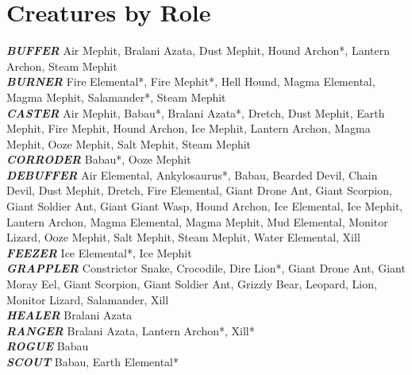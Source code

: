 \newpage

\section{Creatures by Role}

\vspace{5pt}

\textbf{\textit{BUFFER}} Air Mephit, Bralani Azata, Dust Mephit, Hound Archon*, Lantern Archon, Steam Mephit \\

\textbf{\textit{BURNER}} Fire Elemental*, Fire Mephit*, Hell Hound, Magma Elemental, \\ Magma Mephit, Salamander*, Steam Mephit \\

\textbf{\textit{CASTER}} Air Mephit, Babau*, Bralani Azata*, Dretch, Dust Mephit, Earth Mephit, Fire Mephit, Hound Archon, Ice Mephit, Lantern Archon, Magma Mephit, Ooze Mephit, Salt Mephit, Steam Mephit \\

\textbf{\textit{CORRODER}} Babau*, Ooze Mephit \\

\textbf{\textit{DEBUFFER}} Air Elemental, Ankylosaurus*, Babau, Bearded Devil, Chain Devil, Dust Mephit, Dretch, Fire Elemental, Giant Drone Ant, Giant Scorpion, Giant Soldier Ant, Giant Giant Wasp, Hound Archon, Ice Elemental, Ice Mephit, Lantern Archon, Magma Elemental, Magma Mephit, Mud Elemental, Monitor Lizard, Ooze Mephit, Salt Mephit, Steam Mephit, Water Elemental, Xill \\

\textbf{\textit{FEEZER}} Ice Elemental*, Ice Mephit \\

\textbf{\textit{GRAPPLER}} Constrictor Snake, Crocodile, Dire Lion*, Giant Drone Ant, Giant Moray Eel, Giant Scorpion, Giant Soldier Ant, Grizzly Bear, Leopard, Lion, Monitor Lizard, Salamander, Xill \\

\textbf{\textit{HEALER}} Bralani Azata \\

\textbf{\textit{RANGER}} Bralani Azata, Lantern Archon*, Xill* \\

\textbf{\textit{ROGUE}} Babau \\

\textbf{\textit{SCOUT}} Babau, Earth Elemental* \\

